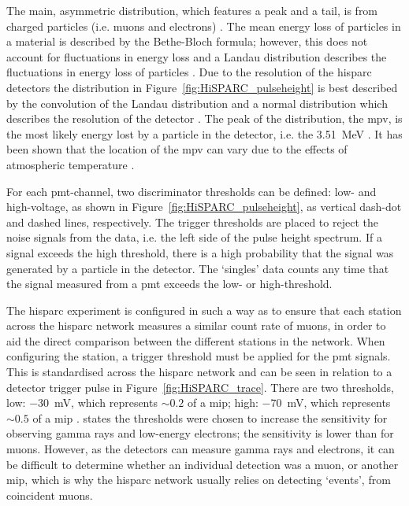 The main, asymmetric distribution, which features a peak and a tail, is from charged particles (i.e. muons and electrons) \citep{van_dam_hisparc_2020}. The mean energy loss of particles in a material is described by the Bethe-Bloch formula; however, this does not account for fluctuations in energy loss and a Landau distribution describes the fluctuations in energy loss of particles \citep{fokkema_hisparc_2012}. Due to the resolution of the \gls{hisparc} detectors the distribution in Figure~\ref{fig:HiSPARC_pulseheight} is best described by the convolution of the Landau distribution and a normal distribution which describes the resolution of the detector \citep{fokkema_hisparc_2012}. The peak of the distribution, the \gls{mpv}, is the most likely energy lost by a particle in the detector, i.e. the 3.51~MeV \citep{van_dam_hisparc_2020}. It has been shown that the location of the \gls{mpv} can vary due to the effects of atmospheric temperature \citep{bartels_hisparc_2012, van_dam_hisparc_2020}.

For each \gls{pmt}-channel, two discriminator thresholds can be defined: low- and high-voltage, as shown in Figure~\ref{fig:HiSPARC_pulseheight}, as vertical dash-dot and dashed lines, respectively.  The trigger thresholds are placed to reject the noise signals from the data, i.e. the left side of the pulse height spectrum. If a signal exceeds the high threshold, there is a high probability that the signal was generated by a particle in the detector. The `singles' data counts any time that the signal measured from a \gls{pmt} exceeds the low- or high-threshold.

The \gls{hisparc} experiment is configured in such a way as to ensure that each station across the \gls{hisparc} network measures a similar count rate of muons, in order to aid the direct comparison between the different stations in the network. When configuring the station, a trigger threshold must be applied for the \gls{pmt} signals. This is standardised across the \gls{hisparc} network and can be seen in relation to a detector trigger pulse in Figure~\ref{fig:HiSPARC_trace}. There are two thresholds, low: $-30$~mV, which represents $\sim0.2$ of a \gls{mip}; high: $-70$~mV, which represents $\sim0.5$ of a \gls{mip} \citep{fokkema_hisparc_2012, van_dam_hisparc_2020}. \citet{van_dam_hisparc_2020} states the thresholds were chosen to increase the sensitivity for observing gamma rays and low-energy electrons; the sensitivity is lower than for muons. However, as the detectors can measure gamma rays and electrons, it can be difficult to determine whether an individual detection was a muon, or another \gls{mip}, which is why the \gls{hisparc} network usually relies on detecting `events', from coincident muons.

